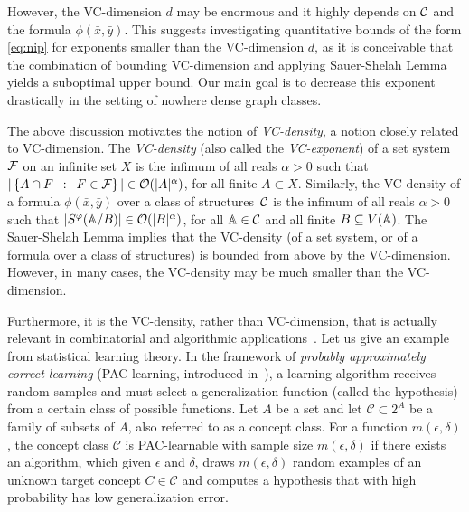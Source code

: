 However, the VC-dimension $d$ may be enormous and it highly depends on $\cal C$ and the formula $\phi(\bar x,\bar y)$.
This suggests investigating quantitative bounds of the form \eqref{eq:nip} for exponents smaller than the VC-dimension $d$, as it is conceivable that the combination of bounding VC-dimension and applying
Sauer-Shelah Lemma yields a suboptimal upper bound. Our main goal is to decrease this exponent drastically in the setting of nowhere dense graph classes.

The above discussion motivates the notion of \emph{VC-density}, a notion closely related to VC-dimension.
The \emph{VC-density} (also called the 
\emph{VC-exponent})
of a set system $\cal F$
on an infinite set $X$ is the infimum of all reals $\alpha>0$ such that 
$|\setof{A\cap F}{F\in \cal F}|\in \Oof(|A|^\alpha)$, for all finite $A\subset X$. 
Similarly, the VC-density of a formula $\phi(\bar x,\bar y)$ over a class of structures~$\cal C$
is the infimum of all reals $\alpha>0$
such that $|S^\phi(\str A/B)|\in \Oof(|B|^\alpha)$,
for all $\str A\in \cal C$ and all finite $B\subset V(\str A)$.
The Sauer-Shelah Lemma
implies that the VC-density (of a set system, or of a formula over a class of structures) is bounded from above by the VC-dimension. 
However, in many cases, the VC-density may be much smaller than the VC-dimension. 

Furthermore, it is the VC-density, rather than VC-di\-men\-sion, that is actually relevant in combinatorial
and algorithmic applications~\cite{Bronnimann1995,matouvsek1998geometric,Matousek:2004:BVI:1005787.1005789,chervonenkis1971theory,blumer1989learnability}. %
Let us give an example from statistical learning theory. 
In the framework of \emph{probably approximately correct learning} 
(PAC learning, introduced in~\cite{valiant1984theory}), a
learning algorithm receives random samples and must 
select a generalization function (called the hypothesis) from 
a certain class of possible 
functions. Let $A$ be a set and let $\mathcal{C}\subset 2^A$
be a family of subsets of $A$, also referred to as a concept
class. For a function $m(\epsilon,\delta)$, the concept 
class $\mathcal{C}$ is PAC-learnable with sample size 
$m(\epsilon,\delta)$ if there exists an algorithm, which given
$\epsilon$ and $\delta$, draws $m(\epsilon,\delta)$ random
examples of an unknown target concept $C\in\mathcal{C}$
and computes a hypothesis that with high 
probability has low generalization error.

